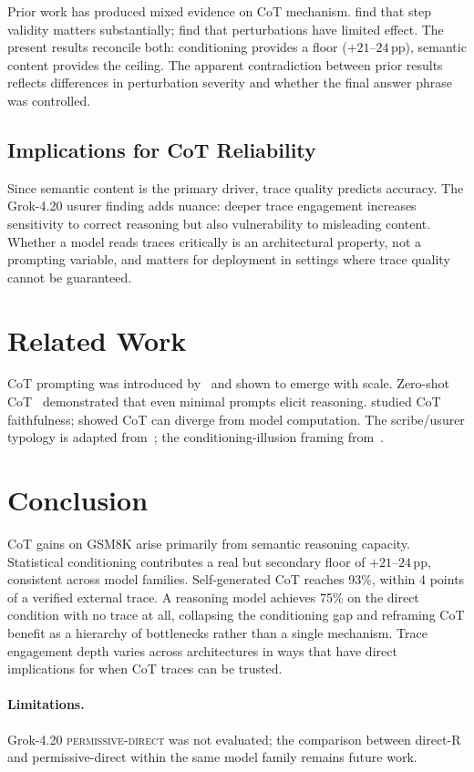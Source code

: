 \documentclass[11pt]{article}
\begin{document}
Prior work has produced mixed evidence on CoT mechanism.
\citet{wang2023towards} find that step validity matters substantially;
\citet{madaan2022text} find that perturbations have limited effect.
The present results reconcile both: conditioning provides a floor ($+21$--$24$\,pp),
semantic content provides the ceiling. The apparent contradiction between prior results
reflects differences in perturbation severity and whether the final answer phrase was
controlled.

\subsection{Implications for CoT Reliability}

Since semantic content is the primary driver, trace quality predicts accuracy. The
Grok-4.20 usurer finding adds nuance: deeper trace engagement increases sensitivity to
correct reasoning but also vulnerability to misleading content. Whether a model reads traces
critically is an architectural property, not a prompting variable, and matters for deployment
in settings where trace quality cannot be guaranteed.

\section{Related Work}

CoT prompting was introduced by~\citet{wei2022chain} and shown to emerge with scale.
Zero-shot CoT~\citep{kojima2022large} demonstrated that even minimal prompts elicit reasoning.
\citet{lanham2023measuring} studied CoT faithfulness; \citet{turpin2023language} showed CoT
can diverge from model computation.
The scribe/usurer typology is adapted from~\citet{latour1984irreductions}; the
conditioning-illusion framing from~\citet{attali1984illusions}.

\section{Conclusion}

CoT gains on GSM8K arise primarily from semantic reasoning capacity. Statistical conditioning
contributes a real but secondary floor of $+21$--$24$\,pp, consistent across model families.
Self-generated CoT reaches 93\%, within 4 points of a verified external trace. A reasoning
model achieves 75\% on the direct condition with no trace at all, collapsing the conditioning
gap and reframing CoT benefit as a hierarchy of bottlenecks rather than a single mechanism.
Trace engagement depth varies across architectures in ways that have direct implications for
when CoT traces can be trusted.

\paragraph{Limitations.} Grok-4.20 \textsc{permissive-direct} was not evaluated; the
comparison between direct-R and permissive-direct within the same model family remains
future work.



\end{document}
